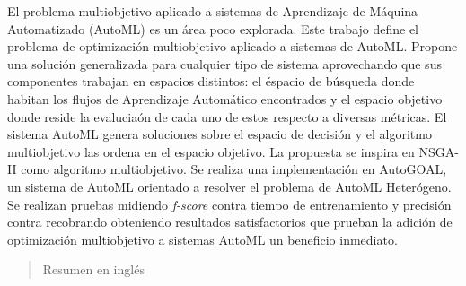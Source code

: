 \begin{resumen}
	El problema multiobjetivo aplicado a sistemas de Aprendizaje de M\'aquina Automatizado (AutoML) es un \'area poco explorada. Este trabajo define el problema de optimizaci\'on multiobjetivo aplicado a sistemas de AutoML. Propone una soluci\'on generalizada para cualquier tipo de sistema aprovechando que sus componentes trabajan en espacios distintos: el \'espacio de b\'usqueda donde habitan los flujos de Aprendizaje Autom\'atico encontrados y el espacio objetivo donde reside la evalucia\'on de cada uno de estos respecto a diversas m\'etricas.
    El sistema AutoML genera soluciones sobre el espacio de decisi\'on y el algoritmo multiobjetivo las ordena en el espacio objetivo.
    La propuesta se inspira en NSGA-II como algoritmo multiobjetivo. 
    Se realiza una implementaci\'on en AutoGOAL, un sistema de AutoML orientado a resolver el problema de AutoML Heter\'ogeno. Se realizan pruebas midiendo \textit{f-score} contra tiempo de entrenamiento y precisi\'on contra recobrando obteniendo resultados satisfactorios que prueban la adici\'on de optimizaci\'on multiobjetivo a sistemas AutoML un beneficio inmediato.
\end{resumen}

\begin{abstract}
	Resumen en inglés
\end{abstract}
